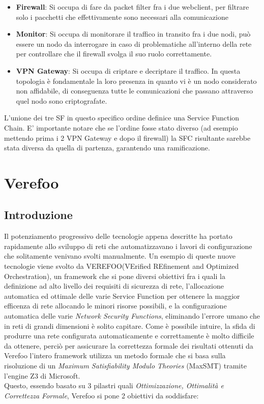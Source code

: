 \begin{itemize}
    \item \textbf{Firewall}: Si occupa di fare da packet filter fra i due webclient, per filtrare solo i pacchetti che effettivamente sono necessari alla comunicazione
    \item \textbf{Monitor}: Si occupa di monitorare il traffico in transito fra i due nodi, può essere un nodo da interrogare in caso di problematiche all'interno della rete per controllare che il firewall svolga il suo ruolo correttamente.
    \item \textbf{VPN Gateway}: Si occupa di criptare e decriptare il traffico. In questa topologia è fondamentale la loro presenza in quanto vi è un nodo considerato non affidabile, di conseguenza tutte le comunicazioni che passano attraverso quel nodo sono criptografate.
\end{itemize}

L'unione dei tre SF in questo specifico ordine definice una Service Function Chain. E' importante notare che se l'ordine fosse stato diverso (ad esempio mettendo prima i 2 VPN Gateway e dopo il firewall)
la SFC risultante sarebbe stata diversa da quella di partenza, garantendo una ramificazione.

\section{Verefoo}
\subsection{Introduzione}
 Il potenziamento progressivo delle tecnologie appena descritte ha portato rapidamente allo sviluppo di reti  che automatizzavano i lavori di configurazione che solitamente venivano svolti manualmente.
 Un esempio di queste nuove tecnologie viene svolto da VEREFOO\cite{Bringhenti2019}(VErified REfinement and Optimized Orchestration), un framework che si pone diversi obiettivi fra i quali la definizione
ad alto livello dei requisiti di sicurezza di rete, l'allocazione automatica ed ottimale delle varie Service Function per ottenere la maggior efficenza di rete allocando le minori risorse possibili, e la
configurazione automatica delle varie \textit{Network Security Functions}, eliminando l'errore  umano che in reti di grandi dimensioni è solito capitare.
Come è possibile intuire, la sfida di produrre una rete configurata automaticamente e correttamente è molto difficile da ottenere, perciò per assicurare la correttezza formale dei risultati ottenuti da Verefoo
l'intero framework utilizza un metodo formale che si basa sulla risoluzione di un \textit{Maximum Satisfiability Modulo Theories} (MaxSMT) tramite l'engine Z3 di Microsoft.\\
Questo, essendo basato su 3 pilastri quali \textit{Ottimizzazione, Ottimalità e Correttezza Formale}, Verefoo si pone 2 obiettivi da soddisfare:

